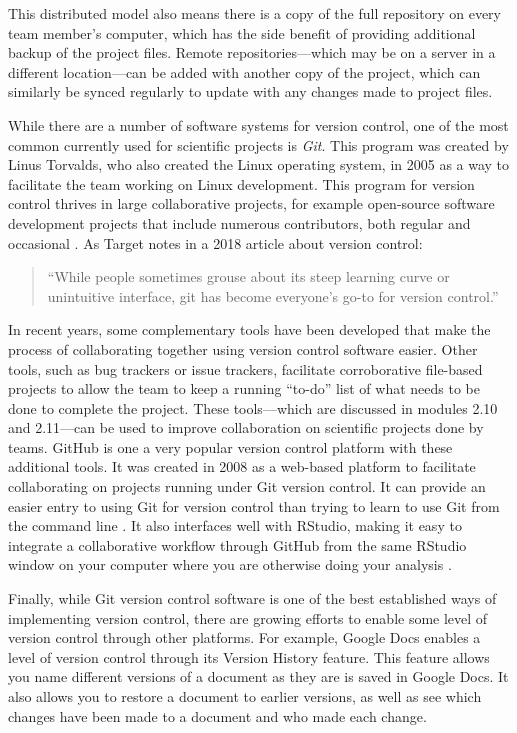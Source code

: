 \documentclass[]{tufte-book}
\begin{document}
This distributed model also means there is a copy of the full repository on
every team member's computer, which has the side benefit of providing additional
backup of the project files. Remote repositories---which may be on a server in a
different location---can be added with another copy of the project, which can
similarly be synced regularly to update with any changes made to project files.

While there are a number of software systems for version control, one of the
most common currently used for scientific projects is \emph{Git}. This program was
created by Linus Torvalds, who also created the Linux operating system, in 2005
as a way to facilitate the team working on Linux development. This program for
version control thrives in large collaborative projects, for example open-source
software development projects that include numerous contributors, both regular
and occasional \citep{brown2018git}. As Target notes in a 2018 article about
version control:

\begin{quote}
``While people sometimes grouse about its steep learning curve or unintuitive
interface, git has become everyone's go-to for version control.''
\citep{target2018version}
\end{quote}

In recent years, some complementary tools have been developed that make the
process of collaborating together using version control software easier. Other
tools, such as bug trackers or issue trackers, facilitate corroborative
file-based projects to allow the team to keep a running ``to-do'' list of what
needs to be done to complete the project. These tools---which are discussed in
modules 2.10 and 2.11---can be used to improve collaboration on scientific
projects done by teams. GitHub is one a very popular version control platform
with these additional tools. It was created in 2008 as a web-based platform to
facilitate collaborating on projects running under Git version control. It can
provide an easier entry to using Git for version control than trying to learn to
use Git from the command line \citep{perez2016ten}. It also interfaces well with RStudio,
making it easy to integrate a collaborative workflow through GitHub from the
same RStudio window on your computer where you are otherwise doing your analysis
\citep{perez2016ten}.

Finally, while Git version control software is one of the best established ways
of implementing version control, there are growing efforts to enable some level
of version control through other platforms. For example, Google Docs enables a
level of version control through its Version History feature. This feature
allows you name different versions of a document as they are is saved in Google
Docs. It also allows you to restore a document to earlier versions, as well as
see which changes have been made to a document and who made each change.
\end{document}

